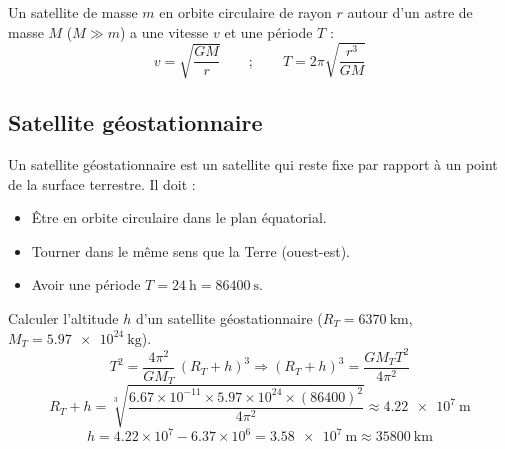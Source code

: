 \begin{propriete}
Un satellite de masse $m$ en orbite circulaire de rayon $r$ autour d'un astre de masse $M$ ($M \gg m$) a une vitesse $v$ et une période $T$ :
\[
v = \sqrt{\frac{GM}{r}} \qquad ; \qquad T = 2\pi\sqrt{\frac{r^3}{GM}}
\]
\end{propriete}

\begin{illus}
\end{illus}

\subsection{Satellite géostationnaire}

\begin{definition}
Un satellite géostationnaire est un satellite qui reste fixe par rapport à un point de la surface terrestre. Il doit :
\begin{itemize}
\item Être en orbite circulaire dans le plan équatorial.
\item Tourner dans le même sens que la Terre (ouest-est).
\item Avoir une période $T = \SI{24}{\hour} = \SI{86400}{\second}$.
\end{itemize}
\end{definition}

\begin{exemple}
Calculer l'altitude $h$ d'un satellite géostationnaire ($R_T = \SI{6370}{\kilo\metre}$, $M_T = \SI{5.97e24}{\kilogram}$).
\[
T^2 = \frac{4\pi^2}{GM_T}\,(R_T+h)^3 \Rightarrow (R_T+h)^3 = \frac{GM_T T^2}{4\pi^2}
\]
\[
R_T+h = \sqrt[3]{\frac{6.67\times10^{-11}\times5.97\times10^{24}\times(86400)^2}{4\pi^2}} \approx \SI{4.22e7}{\metre}
\]
\[
h = 4.22\times10^7 - 6.37\times10^6 = \SI{3.58e7}{\metre} \approx \SI{35800}{\kilo\metre}
\]
\end{exemple}

